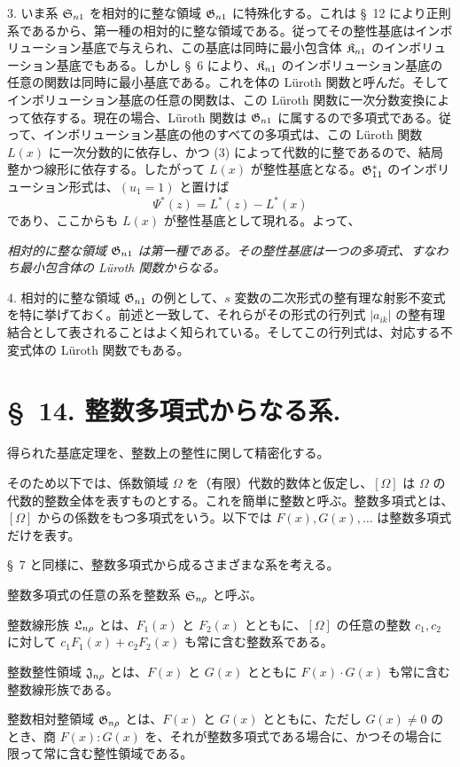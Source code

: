 \documentclass[11pt]{jlreq}
\begin{document}
3. いま系 $\mathfrak{S}_{n1}$ を相対的に整な領域 $\mathfrak{G}_{n1}$ に特殊化する。これは \S\ 12 により正則系であるから、第一種の相対的に整な領域である。従ってその整性基底はインボリューション基底で与えられ、この基底は同時に最小包含体 $\mathfrak{K}_{n1}$ のインボリューション基底でもある。しかし \S\ 6 により、$\mathfrak{K}_{n1}$ のインボリューション基底の任意の関数は同時に最小基底である。これを体の Lüroth 関数と呼んだ。そしてインボリューション基底の任意の関数は、この Lüroth 関数に一次分数変換によって依存する。現在の場合、Lüroth 関数は $\mathfrak{G}_{n1}$ に属するので多項式である。従って、インボリューション基底の他のすべての多項式は、この Lüroth 関数 $L(x)$ に一次分数的に依存し、かつ (3) によって代数的に整であるので、結局整かつ線形に依存する。したがって $L(x)$ が整性基底となる。$\mathfrak{G}^*_{11}$ のインボリューション形式は、$(u_1=1)$ と置けば
\[
  \Psi^*(z)=L^*(z)-L^*(x)
\]
であり、ここからも $L(x)$ が整性基底として現れる。よって、

\emph{相対的に整な領域 $\mathfrak{G}_{n1}$ は第一種である。その整性基底は一つの多項式、すなわち最小包含体の Lüroth 関数からなる。}

4. 相対的に整な領域 $\mathfrak{G}_{n1}$ の例として、$s$ 変数の二次形式の整有理な射影不変式を特に挙げておく。前述と一致して、それらがその形式の行列式 $|a_{ik}|$ の整有理結合として表されることはよく知られている。そしてこの行列式は、対応する不変式体の Lüroth 関数でもある。

\section*{\S\ 14. 整数多項式からなる系.}

得られた基底定理を、整数上の整性に関して精密化する。

そのため以下では、係数領域 $\Omega$ を（有限）代数的数体と仮定し、$[\Omega]$ は $\Omega$ の代数的整数全体を表すものとする。これを簡単に整数と呼ぶ。整数多項式とは、$[\Omega]$ からの係数をもつ多項式をいう。以下では $F(x),G(x),\ldots$ は整数多項式だけを表す。

\S\ 7 と同様に、整数多項式から成るさまざまな系を考える。

整数多項式の任意の系を整数系 $\mathfrak{S}_{n\rho}$ と呼ぶ。

整数線形族 $\mathfrak{L}_{n\rho}$ とは、$F_1(x)$ と $F_2(x)$ とともに、$[\Omega]$ の任意の整数 $c_1,c_2$ に対して $c_1F_1(x)+c_2F_2(x)$ も常に含む整数系である。

整数整性領域 $\mathfrak{J}_{n\rho}$ とは、$F(x)$ と $G(x)$ とともに $F(x)\cdot G(x)$ も常に含む整数線形族である。

整数相対整領域 $\mathfrak{G}_{n\rho}$ とは、$F(x)$ と $G(x)$ とともに、ただし $G(x)\ne0$ のとき、商 $F(x):G(x)$ を、それが整数多項式である場合に、かつその場合に限って常に含む整性領域である。
\end{document}
